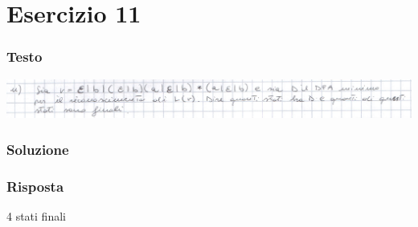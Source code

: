 \chapter{Esercizio 11}

\subsection{Testo}

\begin{center}
    \includegraphics[scale=0.2]{Chapters/Img/11text.png}\\
\end{center} 

\subsection{Soluzione}

\subsection{Risposta}
4 stati finali